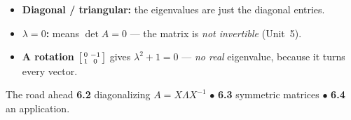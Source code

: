\documentclass[aspectratio=169, 11pt]{beamer}
\begin{document}
\begin{frame}[t, plain]
  \begin{itemize}
    \setlength{\itemsep}{6pt}
    \item \textbf{Diagonal / triangular:} the eigenvalues are just the diagonal entries.
    \item \textbf{$\lambda=0$:} means $\det A=0$ --- the matrix is \emph{not invertible} (Unit~5).
    \item \textbf{A rotation} $\begin{bsmallmatrix} 0 & -1\\ 1 & 0 \end{bsmallmatrix}$ gives
          $\lambda^2+1=0$ --- \emph{no real} eigenvalue, because it turns every vector.
  \end{itemize}
  \vspace{2pt}
  \begin{block}{The road ahead}
    \textbf{6.2} diagonalizing $A=X\Lambda X^{-1}$ \;$\bullet$\; \textbf{6.3} symmetric matrices
    \;$\bullet$\; \textbf{6.4} an application.
  \end{block}
\end{frame}
\end{document}
